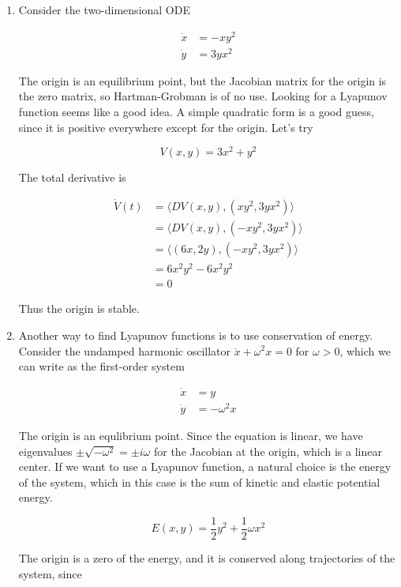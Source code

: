 \documentclass{article}
\begin{document}
\begin{enumerate}

\item Consider the two-dimensional ODE 

\begin{align*}
\dot{x} &= -xy^2 \\
\dot{y} &= 3yx^2
\end{align*}

The origin is an equilibrium point, but the Jacobian matrix for the origin is the zero matrix, so Hartman-Grobman is of no use. Looking for a Lyapunov function seems like a good idea. A simple quadratic form is a good guess, since it is positive everywhere except for the origin. Let's try

\[
V(x, y) = 3x^2 + y^2
\]

The total derivative is 

\begin{align*}
\dot{V}(t) &= \langle DV(x, y), (x y^2, 3 y x^2) \rangle \\ 
&= \langle DV(x, y), (-x y^2, 3 y x^2) \rangle \\
&= \langle (6x, 2y), (-x y^2, 3 y x^2) \rangle \\
&= 6 x^2 y^2 - 6 x^2 y^2 \\
&= 0
\end{align*}

Thus the origin is stable.

\item Another way to find Lyapunov functions is to use conservation of energy. Consider the undamped harmonic oscillator $\ddot{x} + \omega^2 x = 0$ for $\omega > 0$, which we can write as the first-order system

\begin{align*}
\dot{x} &= y \\
\dot{y} &= -\omega^2 x
\end{align*}

The origin is an equlibrium point. Since the equation is linear, we have eigenvalues $\pm \sqrt{-\omega^2} = \pm i \omega$ for the Jacobian at the origin, which is a linear center. If we want to use a Lyapunov function, a natural choice is the energy of the system, which in this case is the sum of kinetic and elastic potential energy.

\[
E(x, y) = \frac{1}{2}y^2 + \frac{1}{2}\omega x^2
\] 

The origin is a zero of the energy, and it is conserved along trajectories of the system, since


\end{enumerate}
\end{document}
